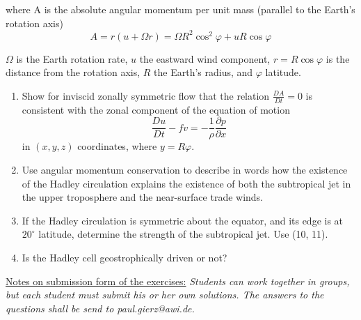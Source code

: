\documentclass[a4paper,12pt]{article}
\begin{document}
\begin{enumerate}
where A is the absolute angular momentum per unit mass (parallel to
the Earth's rotation axis)
 \begin{equation}
 A = r
      \left(u + \Omega r \right) = \Omega R^{2} \cos^{2} \varphi + u R
      \cos \varphi
\end{equation}

 $\Omega$ is the Earth rotation rate, $u$ the eastward wind component,
 $ r = R \cos \varphi $ is the distance from the rotation axis, $R$
 the Earth's radius, and $\varphi$ latitude.

\begin{enumerate}

\item Show for inviscid zonally symmetric flow that the relation
  $\frac{DA}{Dt}=0$ is consistent with the zonal component of the equation of motion 
 \begin{equation}
      \frac{Du}{Dt} - f v = -\frac{1}{\rho}\frac{\partial p}{\partial x}
      \label{udyn}
\end{equation}
in $\left(x,y,z\right)$ coordinates, where $y=R\varphi$.

\item Use angular momentum conservation to describe in words how the
  existence of the Hadley circulation explains the existence of both
  the subtropical jet in the upper troposphere and the near-surface trade winds.

\item If the Hadley circulation is symmetric about the equator, and
  its edge is at $20^{\circ}$ latitude, determine the strength of the subtropical jet. Use (10, 11).

\item Is the Hadley cell geostrophically driven or not?
\end{enumerate}

\end{enumerate}


\vfill
\underline{Notes on submission form of the exercises:}
 \textit{Students can work together in groups, but each student must
   submit his or her own solutions. The answers to the questions shall be send to paul.gierz@awi.de.}
\end{document}
